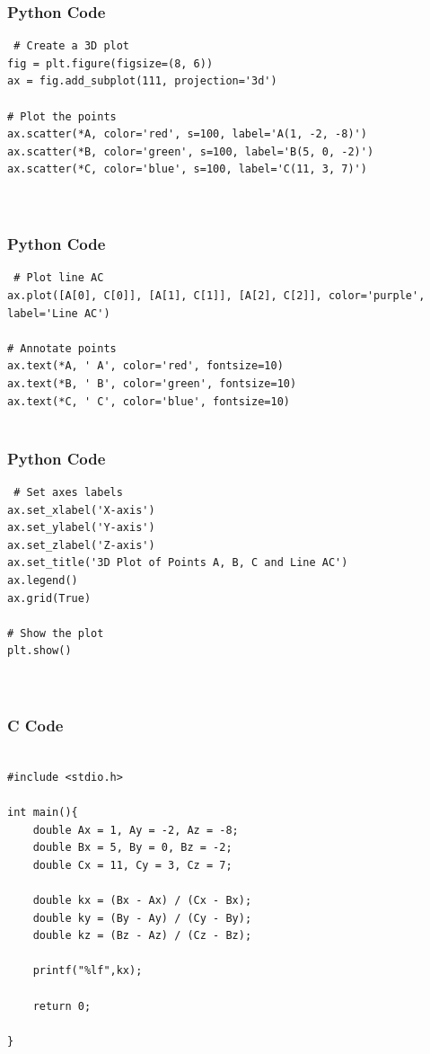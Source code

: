 \documentclass{beamer}
\begin{document}
\begin{frame}[fragile]
    \frametitle{Python Code}

    \begin{lstlisting}
 # Create a 3D plot
fig = plt.figure(figsize=(8, 6))
ax = fig.add_subplot(111, projection='3d')

# Plot the points
ax.scatter(*A, color='red', s=100, label='A(1, -2, -8)')
ax.scatter(*B, color='green', s=100, label='B(5, 0, -2)')
ax.scatter(*C, color='blue', s=100, label='C(11, 3, 7)')



    \end{lstlisting}
\end{frame}

\begin{frame}[fragile]
    \frametitle{Python Code}

    \begin{lstlisting}
 # Plot line AC
ax.plot([A[0], C[0]], [A[1], C[1]], [A[2], C[2]], color='purple', label='Line AC')

# Annotate points
ax.text(*A, ' A', color='red', fontsize=10)
ax.text(*B, ' B', color='green', fontsize=10)
ax.text(*C, ' C', color='blue', fontsize=10)


    \end{lstlisting}
\end{frame}

\begin{frame}[fragile]
    \frametitle{Python Code}

    \begin{lstlisting}
 # Set axes labels
ax.set_xlabel('X-axis')
ax.set_ylabel('Y-axis')
ax.set_zlabel('Z-axis')
ax.set_title('3D Plot of Points A, B, C and Line AC')
ax.legend()
ax.grid(True)

# Show the plot
plt.show()



\end{lstlisting}
\end{frame}

 



 


\begin{frame}[fragile]
\frametitle{C Code}
\begin{lstlisting}
  
#include <stdio.h>

int main(){
    double Ax = 1, Ay = -2, Az = -8;
    double Bx = 5, By = 0, Bz = -2;
    double Cx = 11, Cy = 3, Cz = 7;

    double kx = (Bx - Ax) / (Cx - Bx);
    double ky = (By - Ay) / (Cy - By);
    double kz = (Bz - Az) / (Cz - Bz);

    printf("%lf",kx);

    return 0;

}





\end{lstlisting}

\end{frame}
\end{document}

